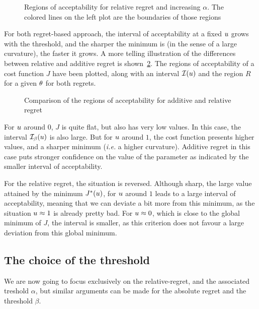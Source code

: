 \documentclass[../../Main_ManuscritThese.tex]{subfiles}
\newcommand\imgpath{/home/victor/acadwriting/Manuscrit/Text/Chapter3/img/}
\begin{document}
\begin{figure}[ht]
  \centering
  
  \caption{\label{fig:gamma_alpha_increasing} Regions of acceptability for relative regret and increasing $\alpha$. The colored lines on the left plot are the boundaries of those regions}
\end{figure}

For both regret-based approach, the interval of acceptability at a fixed $u$ grows with the threshold, and the sharper the minimum is (in the sense of a large curvature), the faster it grows.
A more telling illustration of the differences between relative and additive regret is shown~\cref{fig:illustration_region_regret}.
The regions of acceptability of a cost function $J$ have been plotted, along with an interval $\mathcal{I}(u)$ and the region $R$ for a given $\theta$ for both regrets.
\begin{figure}[ht]
  \centering
  
  \caption{\label{fig:illustration_region_regret} Comparison of the regions of acceptability for additive and relative regret}
\end{figure}
For $u$ around $0$, $J$ is quite flat, but also has very low values. In this case, the interval $\mathcal{I}_{\beta}(u)$ is also large. But for $u$ around $1$, the cost function presents higher values, and a sharper minimum (\emph{i.e.} a higher curvature). Additive regret in this case puts stronger confidence on the value of the parameter as indicated by the smaller interval of acceptability.

For the relative regret, the situation is reversed. Although sharp, the large value attained by the minimum $J^*(u)$, for $u$ around $1$ leads to a large interval of acceptability, meaning that we can deviate a bit more from this minimum, as the situation $u \approx 1$ is already pretty bad. For $u \approx 0$, which is close to the global minimum of $J$, the interval is smaller, as this criterion does not favour a large deviation from this global minimum.



\subsection{The choice of the threshold}
\label{sec:choice_threshold}
We are now going to focus exclusively on the relative-regret, and the associated treshold $\alpha$, but similar arguments can be made for the absolute regret and the threshold $\beta$.
\end{document}
